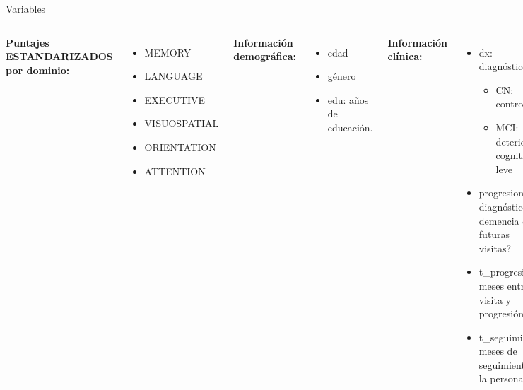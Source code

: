 \documentclass[10pt, aspectratio=169]{beamer}
\begin{document}
\begin{frame}[fragile]{Variables}
 \begin{columns}[T]
  \textcolor{PinkPeacock}{\textbf{Puntajes ESTANDARIZADOS por dominio:}}
  \begin{itemize}
   \item MEMORY
   \item LANGUAGE
   \item EXECUTIVE
   \item VISUOSPATIAL
   \item ORIENTATION
   \item ATTENTION
  \end{itemize}
  \textcolor{BlueMoon}{\textbf{Información demográfica:}}
  \begin{itemize}
   \item edad
   \item género
   \item edu: años de educación.
  \end{itemize}
  \textcolor{SparklingGrape}{\textbf{Información clínica:}}
  \begin{itemize}
   \item dx: diagnóstico
   \begin{itemize}
    \item CN: control
    \item MCI: deterioro cognitivo leve
   \end{itemize}
   \item progresion: diagnóstico de demencia en futuras visitas?
   \item t\_progresión: meses entre visita y progresión.
   \item t\_seguimiento: meses de seguimiento a la persona.
  \end{itemize}
 \end{columns}
\end{frame}
\end{document}
